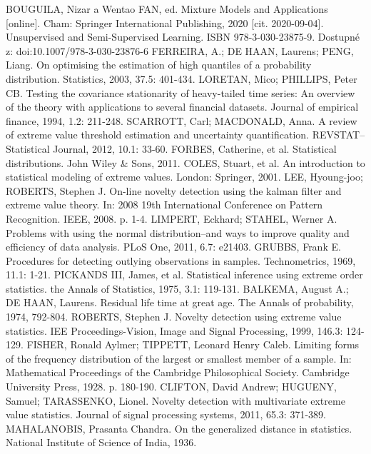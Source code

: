 \documentclass[11pt,twoside,openright]{report}
\begin{document}
\begin{thebibliography}{L}
BOUGUILA, Nizar a Wentao FAN, ed. Mixture Models and Applications [online]. Cham: Springer International Publishing, 2020 [cit. 2020-09-04]. Unsupervised and Semi-Supervised Learning. ISBN 978-3-030-23875-9. Dostupné z: doi:10.1007/978-3-030-23876-6
FERREIRA, A.; DE HAAN, Laurens; PENG, Liang. On optimising the estimation of high quantiles of a probability distribution. Statistics, 2003, 37.5: 401-434.
LORETAN, Mico; PHILLIPS, Peter CB. Testing the covariance stationarity of heavy-tailed time series: An overview of the theory with applications to several financial datasets. Journal of empirical finance, 1994, 1.2: 211-248.
SCARROTT, Carl; MACDONALD, Anna. A review of extreme value threshold estimation and uncertainty quantification. REVSTAT–Statistical Journal, 2012, 10.1: 33-60.
FORBES, Catherine, et al. Statistical distributions. John Wiley \& Sons, 2011.
COLES, Stuart, et al. An introduction to statistical modeling of extreme values. London: Springer, 2001.
LEE, Hyoung-joo; ROBERTS, Stephen J. On-line novelty detection using the kalman filter and extreme value theory. In: 2008 19th International Conference on Pattern Recognition. IEEE, 2008. p. 1-4.
LIMPERT, Eckhard; STAHEL, Werner A. Problems with using the normal distribution–and ways to improve quality and efficiency of data analysis. PLoS One, 2011, 6.7: e21403.
GRUBBS, Frank E. Procedures for detecting outlying observations in samples. Technometrics, 1969, 11.1: 1-21.
PICKANDS III, James, et al. Statistical inference using extreme order statistics. the Annals of Statistics, 1975, 3.1: 119-131.
BALKEMA, August A.; DE HAAN, Laurens. Residual life time at great age. The Annals of probability, 1974, 792-804.
ROBERTS, Stephen J. Novelty detection using extreme value statistics. IEE Proceedings-Vision, Image and Signal Processing, 1999, 146.3: 124-129.
FISHER, Ronald Aylmer; TIPPETT, Leonard Henry Caleb. Limiting forms of the frequency distribution of the largest or smallest member of a sample. In: Mathematical Proceedings of the Cambridge Philosophical Society. Cambridge University Press, 1928. p. 180-190.
CLIFTON, David Andrew; HUGUENY, Samuel; TARASSENKO, Lionel. Novelty detection with multivariate extreme value statistics. Journal of signal processing systems, 2011, 65.3: 371-389.
MAHALANOBIS, Prasanta Chandra. On the generalized distance in statistics. National Institute of Science of India, 1936.

\end{thebibliography}
\end{document}
